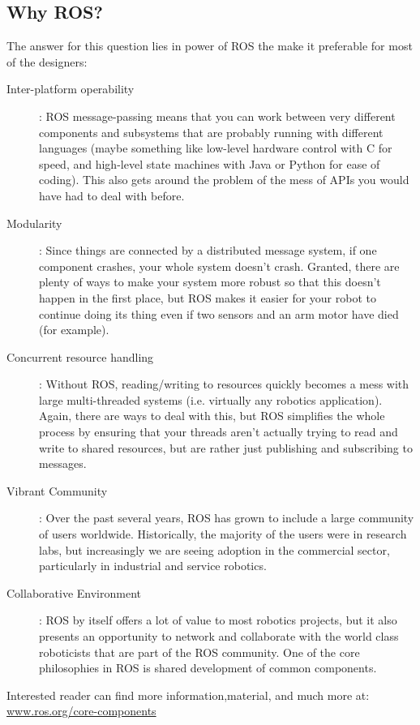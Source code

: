 \subsection{Why ROS?}
	The answer for this question lies in power of ROS the make it preferable for most of the designers: 
  
	\begin{description}
		\item [Inter-platform operability]: ROS message-passing means that you can work between very different components and subsystems that are probably running with different languages (maybe something like low-level hardware control with C for speed, and high-level state machines with Java or Python for ease of coding). This also gets around the problem of the mess of APIs you would have had to deal with before.
		
		\item [Modularity]: Since things are connected by a distributed message system, if one component crashes, your whole system doesn't crash. Granted, there are plenty of ways to make your system more robust so that this doesn't happen in the first place, but ROS makes it easier for your robot to continue doing its thing even if two sensors and an arm motor have died (for example).
		
		\item [Concurrent resource handling]: Without ROS, reading/writing to resources quickly becomes a mess with large multi-threaded systems (i.e. virtually any robotics application). Again, there are ways to deal with this, but ROS simplifies the whole process by ensuring that your threads aren't actually trying to read and write to shared resources, but are rather just publishing and subscribing to messages.
		\item[ Vibrant Community]: Over the past several years, ROS has grown to include a large community of users worldwide. Historically, the majority of the users were in research labs, but increasingly we are seeing adoption in the commercial sector, particularly in industrial and service robotics.
		
		\item [Collaborative Environment]: ROS by itself offers a lot of value to most robotics projects, but it also presents an opportunity to network and collaborate with the world class roboticists that are part of the ROS community. One of the core philosophies in ROS is shared development of common components.
	\end{description}
Interested reader can find more information,material, and much more at:  \url{www.ros.org/core-components}

